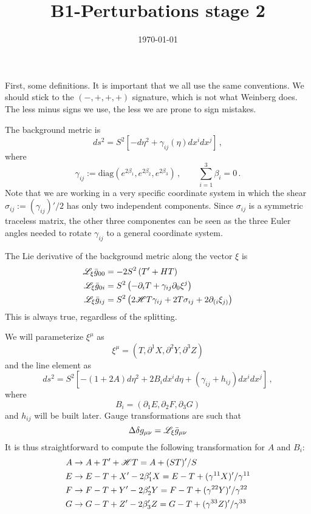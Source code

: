 \documentclass{article}
\title{B1-Perturbations stage 2}
\date{\today}
\begin{document}
\maketitle
First, some definitions. It is important that we all use the same
conventions. We should stick to the $\left(-,+,+,+\right)$ signature,
which is not what Weinberg does. The less minus signs we use, the
less we are prone to sign mistakes.

The background metric is
\[
ds^{2}=S^{2}\left[-d\eta^{2}+\gamma_{ij}(\eta)dx^{i}dx^{j}\right]\,,
\]
where
\[
\gamma_{ij}:=\mbox{diag}(e^{2\beta_{1}},e^{2\beta_{2}},e^{2\beta_{3}})\,,\qquad\sum_{i=1}^{3}\beta_{i}=0\,.
\]
Note that we are working in a very specific coordinate system in which
the shear $\sigma_{ij}:=(\gamma_{ij})'/2$ has only two independent
components. Since $\sigma_{ij}$ is a symmetric traceless matrix,
the other three componentes can be seen as the three Euler angles
needed to rotate $\gamma_{ij}$ to a general coordinate system. 

The Lie derivative of the background metric along the vector $\xi$
is
\begin{align*}
{\cal L}_{\xi}\bar{g}_{00} & =-2S^{2}\left(T'+HT\right)\\
{\cal L}_{\xi}\bar{g}_{0i} & =S^{2}\left(-\partial_{i}T+\gamma_{ij}\partial_{0}\xi^{j}\right)\\
{\cal L}_{\xi}\bar{g}_{ij} & =S^{2}\left(2{\cal H}T\gamma_{ij}+2T\sigma_{ij}+2\partial_{(i}\xi_{j)}\right)
\end{align*}
This is always true, regardless of the splitting. 

We will parameterize $\xi^{\mu}$ as
\[
\xi^{\mu}=\left(T,\partial^{1}X,\partial^{2}Y,\partial^{3}Z\right)
\]
and the line element as
\[
ds^{2}=S^{2}\left[-(1+2A)d\eta^{2}+2B_{i}dx^{i}d\eta+(\gamma_{ij}+h_{ij})dx^{i}dx^{j}\right]\,,
\]
where
\[
B_{i}=\left(\partial_{1}E,\partial_{2}F,\partial_{3}G\right)
\]
and $h_{ij}$ will be built later. Gauge transformations are such
that
\[
\Delta\delta g_{\mu\nu}={\cal L}_{\xi}\bar{g}_{\mu\nu}
\]
It is thus straightforward to compute the following transformation
for $A$ and $B_{i}$: 
\begin{align*}
A & \rightarrow A+T'+{\cal H}T=A+(ST)'/S\\
E & \rightarrow E-T+X'-2\beta_{1}'X=E-T+(\gamma^{11}X)'/\gamma^{11}\\
F & \rightarrow F-T+Y'-2\beta_{2}'Y=F-T+(\gamma^{22}Y)'/\gamma^{22}\\
G & \rightarrow G-T+Z'-2\beta_{3}'Z=G-T+(\gamma^{33}Z)'/\gamma^{33}
\end{align*}
\end{document}
